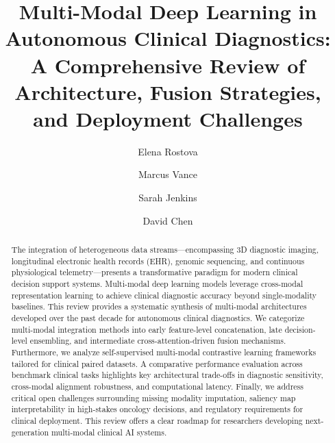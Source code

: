 \documentclass[final,3p,times]{elsarticle}
\begin{document}
\begin{frontmatter}

\title{Multi-Modal Deep Learning in Autonomous Clinical Diagnostics: A Comprehensive Review of Architecture, Fusion Strategies, and Deployment Challenges}

\author[inst1]{Elena Rostova}

\author[inst1,inst2]{Marcus Vance}

\author[inst3]{Sarah Jenkins}

\author[inst2]{David Chen}




\begin{abstract}
The integration of heterogeneous data streams---encompassing 3D diagnostic imaging, longitudinal electronic health records (EHR), genomic sequencing, and continuous physiological telemetry---presents a transformative paradigm for modern clinical decision support systems. Multi-modal deep learning models leverage cross-modal representation learning to achieve clinical diagnostic accuracy beyond single-modality baselines. This review provides a systematic synthesis of multi-modal architectures developed over the past decade for autonomous clinical diagnostics. We categorize multi-modal integration methods into early feature-level concatenation, late decision-level ensembling, and intermediate cross-attention-driven fusion mechanisms. Furthermore, we analyze self-supervised multi-modal contrastive learning frameworks tailored for clinical paired datasets. A comparative performance evaluation across benchmark clinical tasks highlights key architectural trade-offs in diagnostic sensitivity, cross-modal alignment robustness, and computational latency. Finally, we address critical open challenges surrounding missing modality imputation, saliency map interpretability in high-stakes oncology decisions, and regulatory requirements for clinical deployment. This review offers a clear roadmap for researchers developing next-generation multi-modal clinical AI systems.
\end{abstract}


\end{frontmatter}
\end{document}
